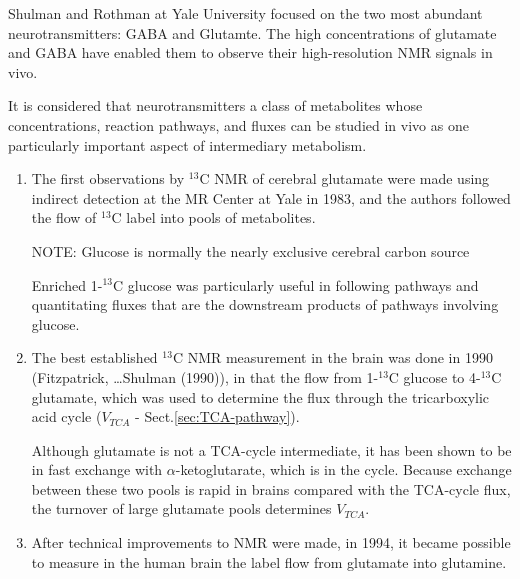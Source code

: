 Shulman and Rothman at Yale University focused on the two most abundant
neurotransmitters: GABA and Glutamte. The high concentrations of glutamate and
GABA have enabled them to observe their high-resolution NMR signals in vivo.

It is considered that neurotransmitters a class of metabolites whose
concentrations, reaction pathways, and fluxes can be studied in vivo as one
particularly important aspect of intermediary metabolism.

\begin{enumerate}
  
  \item The first observations by $^{13}$C NMR of cerebral glutamate were made
  using indirect detection at the MR Center at Yale in 1983, and the authors followed
  the flow of $^{13}$C label into pools of metabolites.

NOTE: Glucose is normally the nearly exclusive cerebral carbon source

Enriched 1-$^{13}$C glucose was particularly useful in following pathways and
quantitating fluxes that are the downstream products of pathways involving
glucose.


  \item The best established $^{13}$C NMR measurement in the brain was done in
  1990 (Fitzpatrick, \ldots Shulman (1990)), in that  the flow from 1-$^{13}$C
  glucose to 4-$^{13}$C glutamate, which was used to determine the flux through
  the tricarboxylic acid cycle ($V_{TCA}$ - Sect.\ref{sec:TCA-pathway}).
  
  Although glutamate is not a TCA-cycle intermediate, it has been shown to be in
  fast exchange with $\alpha$-ketoglutarate, which is in the cycle. Because exchange
  between these two pools is rapid in brains compared with the TCA-cycle flux,
  the turnover of large glutamate pools determines $V_{TCA}$.
  

  \item After technical improvements to NMR were made, in 1994, it became possible to measure
in the human brain the label flow from glutamate into glutamine.



\end{enumerate}
